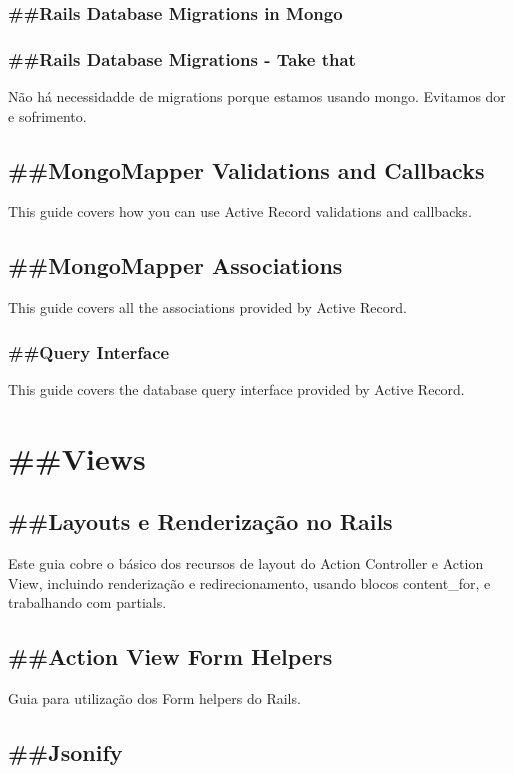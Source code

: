 \documentclass[serif,mathserif]{article}
\begin{document}
\subsubsection{\#\#Rails Database Migrations in Mongo}

\subsubsection{\#\#Rails Database Migrations - Take that}
Não há necessidadde de migrations porque estamos usando mongo.
Evitamos dor e sofrimento.

\subsection{\#\#MongoMapper Validations and Callbacks}
This guide covers how you can use Active Record validations and callbacks.

\subsection{\#\#MongoMapper Associations}
This guide covers all the associations provided by Active Record.


\subsubsection{\#\#Query Interface}
This guide covers the database query interface provided by Active Record.



\section{\#\#Views}

\subsection{\#\#Layouts e Renderização no Rails}
  Este guia cobre o básico dos recursos de layout do Action Controller e Action View,
  incluindo renderização e redirecionamento, usando blocos content\_for, e trabalhando com partials.

\subsection{\#\#Action View Form Helpers}
  Guia para utilização dos Form helpers do Rails.

\subsection{\#\#Jsonify}
\end{document}
